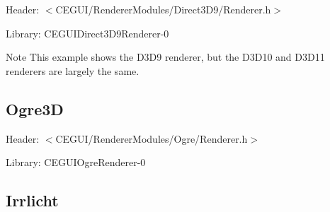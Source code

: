 \begin{DoxyItemize}
\item Header\+: $<$C\+E\+G\+U\+I/\+Renderer\+Modules/\+Direct3\+D9/\+Renderer.\+h$>$
\item Library\+: C\+E\+G\+U\+I\+Direct3\+D9\+Renderer-\/0 
\begin{DoxyCode}{0}
\DoxyCodeLine{\textcolor{comment}{// Bootstrap CEGUI::System with a Direct3D9Renderer object that uses the}}
\DoxyCodeLine{\textcolor{comment}{// DefaultResourceProvider, and the default ImageCodec.}}
\end{DoxyCode}
 \begin{DoxyNote}{Note}
This example shows the D3\+D9 renderer, but the D3\+D10 and D3\+D11 renderers are largely the same.
\end{DoxyNote}

\end{DoxyItemize}\hypertarget{rendering_tutorial_rendering_tutorial_bootstrap_ogre}{}\subsection{Ogre3D}\label{rendering_tutorial_rendering_tutorial_bootstrap_ogre}

\begin{DoxyItemize}
\item Header\+: $<$C\+E\+G\+U\+I/\+Renderer\+Modules/\+Ogre/\+Renderer.\+h$>$
\item Library\+: C\+E\+G\+U\+I\+Ogre\+Renderer-\/0 
\begin{DoxyCode}{0}
\DoxyCodeLine{\textcolor{comment}{// Bootstrap CEGUI::System with an OgreRenderer object that uses the}}
\DoxyCodeLine{\textcolor{comment}{// default Ogre rendering window as the default output surface, an Ogre based}}
\DoxyCodeLine{\textcolor{comment}{// ResourceProvider, and an Ogre based ImageCodec.}}
\end{DoxyCode}

\end{DoxyItemize}\hypertarget{rendering_tutorial_rendering_tutorial_bootstrap_irrlicht}{}\subsection{Irrlicht}\label{rendering_tutorial_rendering_tutorial_bootstrap_irrlicht}

